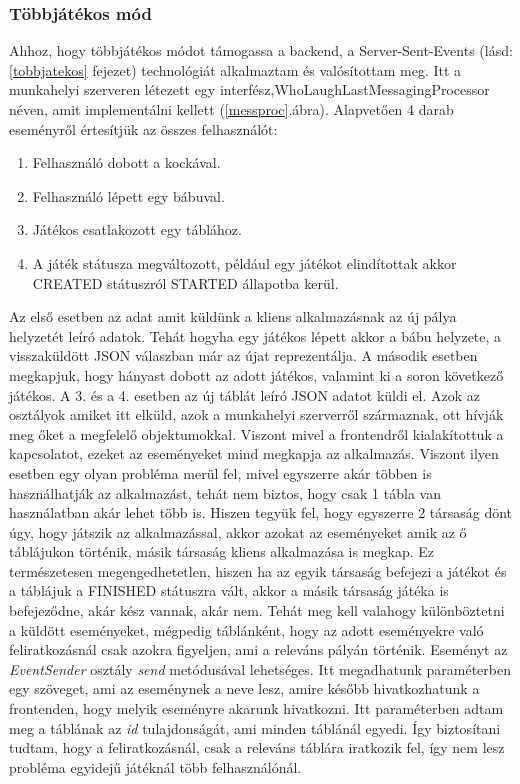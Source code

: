 \documentclass[a4paper,twoside]{article}
\begin{document}
\subsubsection{Többjátékos mód} \label{tobbjatekos-backend}
Ahhoz, hogy többjátékos módot támogassa a backend, a Server-Sent-Events (lásd: \ref{tobbjatekos} fejezet) technológiát alkalmaztam és valósítottam meg. Itt a munkahelyi szerveren létezett  egy interfész,WhoLaughLastMessagingProcessor néven, amit implementálni kellett (\ref{messproc}.ábra). Alapvetően 4 darab eseményről értesítjük az összes felhasználót: \begin{enumerate}
	\item Felhasználó dobott a kockával.
	\item Felhasználó lépett egy bábuval.
	\item Játékos csatlakozott egy táblához.
	\item A játék státusza megváltozott, például egy játékot elindítottak akkor CREATED státuszról STARTED állapotba kerül.
\end{enumerate}
Az első esetben az adat amit küldünk a kliens alkalmazásnak az új pálya helyzetét leíró adatok. Tehát hogyha egy játékos lépett akkor a bábu helyzete, a visszaküldött JSON válaszban már az újat reprezentálja. A második esetben megkapjuk, hogy hányast dobott az adott játékos, valamint ki a soron következő játékos. A 3. és a 4. esetben az új táblát leíró JSON adatot küldi el. Azok az osztályok amiket itt elküld, azok a munkahelyi szerverről származnak, ott hívják meg őket a megfelelő objektumokkal. Viszont mivel a frontendről kialakítottuk a kapcsolatot, ezeket az eseményeket mind megkapja az alkalmazás. Viszont ilyen esetben egy olyan probléma merül fel, mivel egyszerre akár többen is használhatják az alkalmazást, tehát nem biztos, hogy csak 1 tábla van használatban akár lehet több is. Hiszen tegyük fel, hogy egyszerre 2 társaság dönt úgy, hogy játszik az alkalmazással, akkor azokat az eseményeket amik az ő táblájukon történik, másik társaság kliens alkalmazása is megkap. Ez természetesen megengedhetetlen, hiszen ha az egyik társaság befejezi a játékot és a táblájuk a FINISHED státuszra vált, akkor a másik társaság játéka is befejeződne, akár kész vannak, akár nem. Tehát meg kell valahogy különböztetni a küldött eseményeket, mégpedig táblánként, hogy az adott eseményekre való feliratkozásnál csak azokra figyeljen, ami a releváns pályán történik. Eseményt az \textit{EventSender} osztály \textit{send} metódusával lehetséges. Itt megadhatunk paraméterben egy szöveget, ami az eseménynek a neve lesz, amire később hivatkozhatunk a frontenden, hogy melyik eseményre akarunk hivatkozni. Itt paraméterben adtam meg a táblának az \textit{id} tulajdonságát, ami minden táblánál egyedi. Így biztosítani tudtam, hogy a feliratkozásnál, csak a releváns táblára iratkozik fel, így nem lesz probléma egyidejű játéknál több felhasználónál. 
\end{document}
